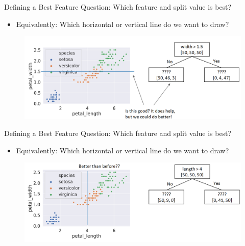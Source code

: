 \documentclass[aspectratio=169]{../latex_main/tntbeamer}  %
\begin{document}
	\begin{frame}{Defining a Best Feature}
	    Question: Which feature and split value is best?
	    \begin{itemize}
	        \item  Equivalently: Which horizontal or vertical line do we want to draw?
	    \end{itemize}
	    \begin{figure}
	        \centering
	        \includegraphics[scale=.4]{figure_tree/Bild43}
	    \end{figure}
	\end{frame}
	
	\begin{frame}{Defining a Best Feature}
	    Question: Which feature and split value is best?
	    \begin{itemize}
	        \item  Equivalently: Which horizontal or vertical line do we want to draw?
	    \end{itemize}
	    \begin{figure}
	        \centering
	        \includegraphics[scale=.4]{figure_tree/Bild44}
	    \end{figure}
	\end{frame}
	
\end{document}
